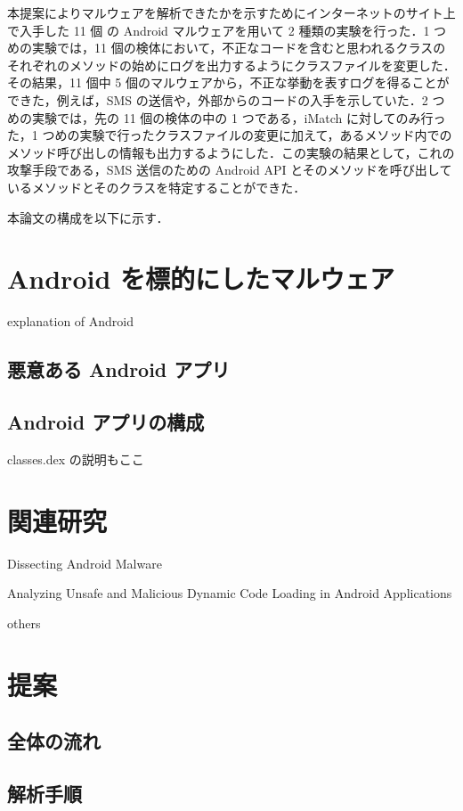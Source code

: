 \documentclass[10pt]{jsarticle}
\begin{document}
本提案によりマルウェアを解析できたかを示すためにインターネットのサイト上で入手した 11 個 の Android マルウェアを用いて 2 種類の実験を行った．1 つめの実験では，11 個の検体において，不正なコードを含むと思われるクラスのそれぞれのメソッドの始めにログを出力するようにクラスファイルを変更した．その結果，11 個中 5 個のマルウェアから，不正な挙動を表すログを得ることができた，例えば，SMS の送信や，外部からのコードの入手を示していた．2 つめの実験では，先の 11 個の検体の中の 1 つである，iMatch に対してのみ行った，1 つめの実験で行ったクラスファイルの変更に加えて，あるメソッド内でのメソッド呼び出しの情報も出力するようにした．この実験の結果として，これの攻撃手段である，SMS 送信のための Android API とそのメソッドを呼び出しているメソッドとそのクラスを特定することができた．

本論文の構成を以下に示す．


\newpage

\section{Android  を標的にしたマルウェア}
explanation of Android
\subsection{悪意ある Android  アプリ}

\subsection{Android アプリの構成}
classes.dex の説明もここ

\newpage
\section{関連研究}

Dissecting Android Malware

Analyzing Unsafe and Malicious Dynamic Code Loading in Android Applications

others

\newpage
\section{提案}

\subsection{全体の流れ}

\subsection{解析手順}
\end{document}
